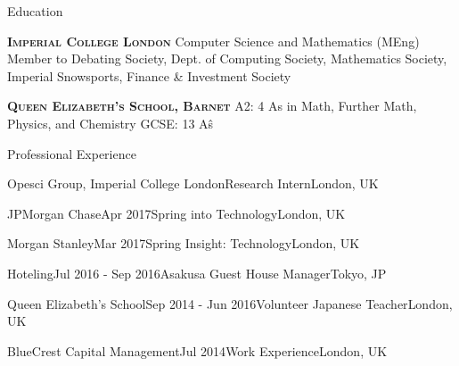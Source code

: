 \documentclass[10pt,a4paper]{article}
\begin{document}
\begin{section}{Education}

\textsc{\textbf{Imperial College London}}
Computer Science and Mathematics (MEng)
Member to Debating Society, Dept. of Computing Society, Mathematics Society, 
Imperial Snowsports, Finance \& Investment Society

\textsc{\textbf{Queen Elizabeth's School, Barnet}}
A2: 4 A\*s in Math, Further Math, Physics, and Chemistry
GCSE: 13 A\^s


\begin{section}{Professional Experience}

\begin{rSubsection}{Opesci Group, Imperial College London}{Research Intern}{London, UK}


\begin{rSubsection}{JPMorgan Chase}{Apr 2017}{Spring into Technology}{London, UK}


\begin{rSubsection}{Morgan Stanley}{Mar 2017}{Spring Insight: Technology}{London, UK}


\begin{rSubsection}{Hoteling}{Jul 2016 - Sep 2016}{Asakusa Guest House Manager}{Tokyo, JP}


\begin{rSubsection}{Queen Elizabeth's School}{Sep 2014 - Jun 2016}{Volunteer Japanese Teacher}{London, UK}


\begin{rSubsection}{BlueCrest Capital Management}{Jul 2014}{Work Experience}{London, UK}



\end{rSubsection}
\end{rSubsection}
\end{rSubsection}
\end{rSubsection}
\end{rSubsection}
\end{rSubsection}
\end{section}
\end{section}
\end{document}
